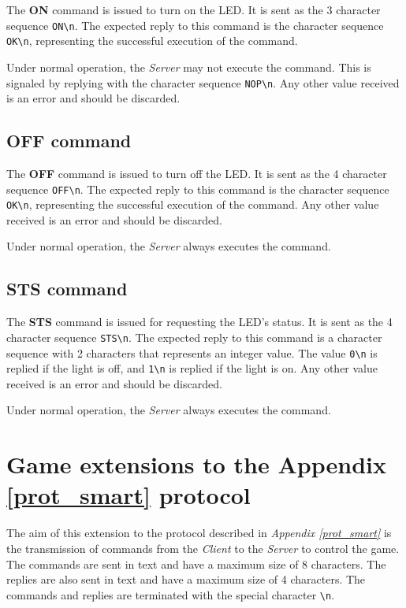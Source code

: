 \documentclass[conference, a4paper]{IEEEtran}
\begin{document}
The \textbf{ON} command is issued to turn on the LED. It is sent as the 3 character sequence \texttt{ON\textbackslash n}. The expected reply to this command is the character sequence \texttt{OK\textbackslash n}, representing the successful execution of the command.

Under normal operation, the \textit{Server} may not execute the command. This is signaled by replying with the character sequence \texttt{NOP\textbackslash n}. Any other value received is an error and should be discarded.

\subsection{OFF command}

The \textbf{OFF} command is issued to turn off the LED. It is sent as the 4 character sequence \texttt{OFF\textbackslash n}. The expected reply to this command is the character sequence \texttt{OK\textbackslash n}, representing the successful execution of the command. Any other value received is an error and should be discarded.

Under normal operation, the \textit{Server} always executes the command.

\subsection{STS command}

The \textbf{STS} command is issued for requesting the LED's status. It is sent as the 4 character sequence \texttt{STS\textbackslash n}. The expected reply to this command is a character sequence with 2 characters that represents an integer value. The value \texttt{0\textbackslash n} is replied if the light is off, and \texttt{1\textbackslash n} is replied if the light is on. Any other value received is an error and should be discarded.

Under normal operation, the \textit{Server} always executes the command.

\vfill\eject

\section{Game extensions to the Appendix \ref{prot_smart} protocol}
\label{prot_smart_ext}

The aim of this extension to the protocol described in \textit{Appendix \ref{prot_smart}} is the transmission of commands from the \textit{Client} to the \textit{Server} to control the game. The commands are sent in text and have a maximum size of 8 characters. The replies are also sent in text and have a maximum size of 4 characters. The commands and replies are terminated with the special character \texttt{\textbackslash n}.
\end{document}
